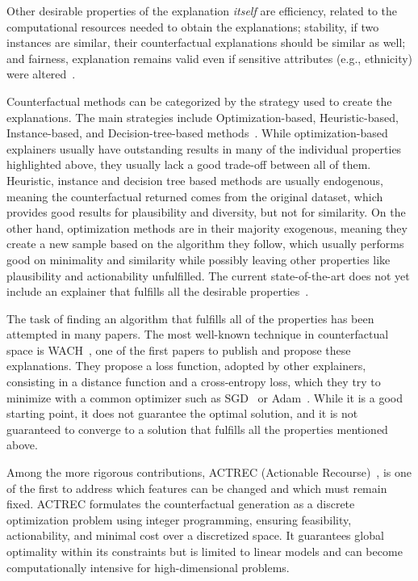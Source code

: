 \documentclass[12pt]{extarticle}
\numberwithin{equation}{section}
\begin{document}
Other desirable properties of the explanation \emph{itself} are efficiency, related to the computational resources needed to obtain the explanations; stability, if two instances are similar, their counterfactual explanations should be similar as well; and fairness, explanation remains valid even if sensitive attributes (e.g., ethnicity) were altered~\cite{guidotti2024counterfactual}.

Counterfactual methods can be categorized by the strategy used to create the explanations. The main strategies include Optimization-based, Heuristic-based, Instance-based, and Decision-tree-based methods~\cite{guidotti2024counterfactual}. While optimization-based explainers usually have outstanding results in many of the individual properties highlighted above, they usually lack a good trade-off between all of them. Heuristic, instance and decision tree based methods are usually endogenous, meaning the counterfactual returned comes from the original dataset, which provides good results for plausibility and diversity, but not for similarity. On the other hand, optimization methods are in their majority exogenous, meaning they create a new sample based on the algorithm they follow, which usually performs good on minimality and similarity while possibly leaving other properties like plausibility and actionability unfulfilled. The current state-of-the-art does not yet include an explainer that fulfills all the desirable properties~\cite{guidotti2024counterfactual}.

The task of finding an algorithm that fulfills all of the properties has been attempted in many papers. The most well-known technique in counterfactual space is WACH~\cite{wachter2017counterfactual}, one of the first papers to publish and propose these explanations. They propose a loss function, adopted by other explainers, consisting in a distance function and a cross-entropy loss, which they try to minimize with a common optimizer such as SGD~\cite{sgd} or Adam~\cite{adam}. While it is a good starting point, it does not guarantee the optimal solution, and it is not guaranteed to converge to a solution that fulfills all the properties mentioned above.

Among the more rigorous contributions, ACTREC (Actionable Recourse)~\cite{ustun2019actionable}, is one of the first to address which features can be changed and which must remain fixed. ACTREC formulates the counterfactual generation as a discrete optimization problem using integer programming, ensuring feasibility, actionability, and minimal cost over a discretized space. It guarantees global optimality within its constraints but is limited to linear models and can become computationally intensive for high-dimensional problems.
\end{document}
